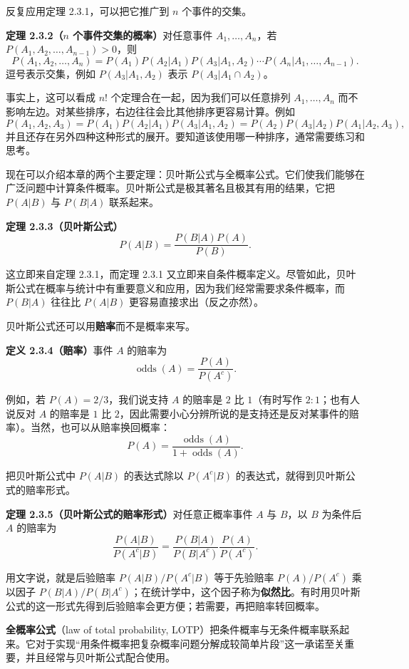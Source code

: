 \documentclass[UTF8,12pt,a4paper,fontset=fandol]{ctexart}
\begin{document}
反复应用定理 2.3.1，可以把它推广到 $n$ 个事件的交集。

\noindent\textbf{定理 2.3.2（$n$ 个事件交集的概率）}\quad 对任意事件 $A_1,\ldots,A_n$，若 $P(A_1,A_2,\ldots,A_{n-1})>0$，则
\[
  P(A_1,A_2,\ldots,A_n)
  =
  P(A_1)P(A_2|A_1)P(A_3|A_1,A_2)\cdots
  P(A_n|A_1,\ldots,A_{n-1}).
\]
逗号表示交集，例如 $P(A_3|A_1,A_2)$ 表示 $P(A_3|A_1\cap A_2)$。

事实上，这可以看成 $n!$ 个定理合在一起，因为我们可以任意排列 $A_1,\ldots,A_n$ 而不影响左边。对某些排序，右边往往会比其他排序更容易计算。例如
\[
  P(A_1,A_2,A_3)
  =
  P(A_1)P(A_2|A_1)P(A_3|A_1,A_2)
  =
  P(A_2)P(A_3|A_2)P(A_1|A_2,A_3),
\]
并且还存在另外四种这种形式的展开。要知道该使用哪一种排序，通常需要练习和思考。

现在可以介绍本章的两个主要定理：贝叶斯公式与全概率公式。它们使我们能够在广泛问题中计算条件概率。贝叶斯公式是极其著名且极其有用的结果，它把 $P(A|B)$ 与 $P(B|A)$ 联系起来。

\noindent\textbf{定理 2.3.3（贝叶斯公式）}\quad
\[
  P(A|B)=\frac{P(B|A)P(A)}{P(B)}.
\]

这立即来自定理 2.3.1，而定理 2.3.1 又立即来自条件概率定义。尽管如此，贝叶斯公式在概率与统计中有重要意义和应用，因为我们经常需要求条件概率，而 $P(B|A)$ 往往比 $P(A|B)$ 更容易直接求出（反之亦然）。

贝叶斯公式还可以用\textbf{赔率}而不是概率来写。

\noindent\textbf{定义 2.3.4（赔率）}\quad 事件 $A$ 的赔率为
\[
  \operatorname{odds}(A)=\frac{P(A)}{P(A^c)}.
\]

例如，若 $P(A)=2/3$，我们说支持 $A$ 的赔率是 $2$ 比 $1$（有时写作 $2:1$；也有人说反对 $A$ 的赔率是 $1$ 比 $2$，因此需要小心分辨所说的是支持还是反对某事件的赔率）。当然，也可以从赔率换回概率：
\[
  P(A)=\frac{\operatorname{odds}(A)}{1+\operatorname{odds}(A)}.
\]

把贝叶斯公式中 $P(A|B)$ 的表达式除以 $P(A^c|B)$ 的表达式，就得到贝叶斯公式的赔率形式。

\noindent\textbf{定理 2.3.5（贝叶斯公式的赔率形式）}\quad 对任意正概率事件 $A$ 与 $B$，以 $B$ 为条件后 $A$ 的赔率为
\[
  \frac{P(A|B)}{P(A^c|B)}
  =
  \frac{P(B|A)}{P(B|A^c)}
  \frac{P(A)}{P(A^c)}.
\]

用文字说，就是后验赔率 $P(A|B)/P(A^c|B)$ 等于先验赔率 $P(A)/P(A^c)$ 乘以因子 $P(B|A)/P(B|A^c)$；在统计学中，这个因子称为\textbf{似然比}。有时用贝叶斯公式的这一形式先得到后验赔率会更方便；若需要，再把赔率转回概率。

\textbf{全概率公式}（law of total probability, LOTP）把条件概率与无条件概率联系起来。它对于实现“用条件概率把复杂概率问题分解成较简单片段”这一承诺至关重要，并且经常与贝叶斯公式配合使用。
\end{document}
